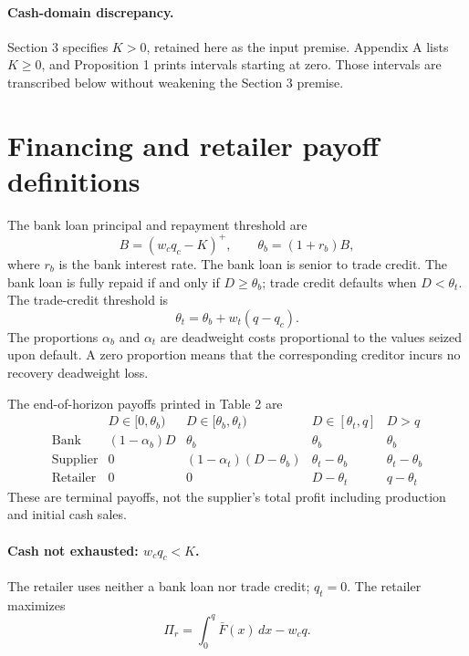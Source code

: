 \documentclass{article}
\begin{document}
\paragraph{Cash-domain discrepancy.}
Section 3 specifies $K>0$, retained here as the input premise. Appendix A lists $K\geq0$, and Proposition 1 prints intervals starting at zero. Those intervals are transcribed below without weakening the Section 3 premise.

\section*{Financing and retailer payoff definitions}
The bank loan principal and repayment threshold are
\[
B=(w_cq_c-K)^+,\qquad \theta_b=(1+r_b)B,
\]
where $r_b$ is the bank interest rate. The bank loan is senior to trade credit. The bank loan is fully repaid if and only if $D\geq\theta_b$; trade credit defaults when $D<\theta_t$. The trade-credit threshold is
\begin{equation}
\theta_t=\theta_b+w_t(q-q_c).\tag{1}
\end{equation}
The proportions $\alpha_b$ and $\alpha_t$ are deadweight costs proportional to the values seized upon default. A zero proportion means that the corresponding creditor incurs no recovery deadweight loss.

The end-of-horizon payoffs printed in Table 2 are
\[
\begin{array}{c|cccc}
& D\in[0,\theta_b)&D\in[\theta_b,\theta_t)&D\in[\theta_t,q]&D>q\\ \hline
\text{Bank}&(1-\alpha_b)D&\theta_b&\theta_b&\theta_b\\
\text{Supplier}&0&(1-\alpha_t)(D-\theta_b)&\theta_t-\theta_b&\theta_t-\theta_b\\
\text{Retailer}&0&0&D-\theta_t&q-\theta_t
\end{array}
\]
These are terminal payoffs, not the supplier's total profit including production and initial cash sales.

\paragraph{Cash not exhausted: $w_cq_c<K$.}
The retailer uses neither a bank loan nor trade credit; $q_t=0$. The retailer maximizes
\[
\Pi_r=\int_0^q\bar F(x)\,dx-w_cq.
\]
\end{document}
